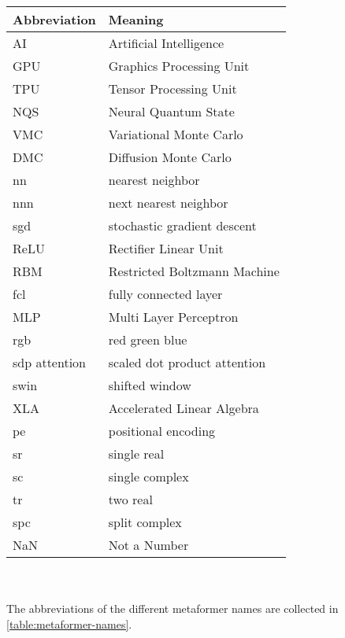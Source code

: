 \noindent\\\\

\begin{tabular}[h]{p{3cm}|l}
	Abbreviation & Meaning\\
	\hline
	AI & Artificial Intelligence\\ 
	GPU & Graphics Processing Unit\\
	TPU & Tensor Processing Unit\\
	NQS & Neural Quantum State\\
	VMC & Variational Monte Carlo\\
	DMC & Diffusion Monte Carlo\\
	nn & nearest neighbor\\
	nnn & next nearest neighbor\\
	sgd & stochastic gradient descent\\
	ReLU & Rectifier Linear Unit\\
	RBM & Restricted Boltzmann Machine\\
	fcl & fully connected layer\\
	MLP & Multi Layer Perceptron\\
	rgb & red green blue\\
	sdp attention & scaled dot product attention\\
	swin & shifted window\\
	XLA & Accelerated Linear Algebra\\
	pe & positional encoding\\
	sr & single real\\
	sc & single complex\\
	tr & two real\\
	spc & split complex\\
	NaN & Not a Number \\
\end{tabular}\\\\

The abbreviations of the different metaformer names are collected in \autoref{table:metaformer-names}.

\newpage